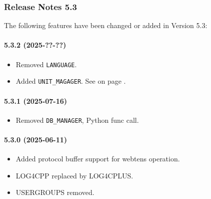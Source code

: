 \subsubsection{Release Notes 5.3}
\label{sec:releasenotes-5-3}
The following features have been changed or added in Version 5.3:\\

\paragraph{5.3.2 (2025-??-??)}  %
\begin{itemize}
\item Removed \verb+LANGUAGE+.
\item Added \verb+UNIT_MAGAGER+.
     See  on page \pageref{sec:unitmanager}.
\end{itemize}

\paragraph{5.3.1 (2025-07-16)}  %
\begin{itemize}
\item Removed \verb+DB_MANAGER+, Python func call.
\end{itemize}

\paragraph{5.3.0 (2025-06-11)}  %

\begin{itemize}
\item Added protocol buffer support for webtens operation.
\item LOG4CPP replaced by LOG4CPLUS.
\item USERGROUPS removed.
\end{itemize}
